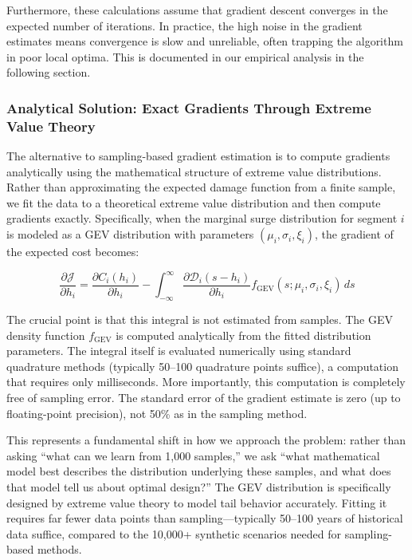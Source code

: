 \documentclass[review]{elsarticle}
\begin{document}
Furthermore, these calculations assume that gradient descent converges in the expected number of iterations. In practice, the high noise in the gradient estimates means convergence is slow and unreliable, often trapping the algorithm in poor local optima. This is documented in our empirical analysis in the following section.

\subsubsection{Analytical Solution: Exact Gradients Through Extreme Value Theory}

The alternative to sampling-based gradient estimation is to compute gradients analytically using the mathematical structure of extreme value distributions. Rather than approximating the expected damage function from a finite sample, we fit the data to a theoretical extreme value distribution and then compute gradients exactly. Specifically, when the marginal surge distribution for segment $i$ is modeled as a GEV distribution with parameters $(\mu_i, \sigma_i, \xi_i)$, the gradient of the expected cost becomes:

\begin{equation}
\frac{\partial \mathcal{J}}{\partial h_i} = \frac{\partial C_i(h_i)}{\partial h_i} - \int_{-\infty}^{\infty} \frac{\partial \mathcal{D}_i(s - h_i)}{\partial h_i} f_{\text{GEV}}(s; \mu_i, \sigma_i, \xi_i) \, ds
\label{eq:analytical_gradient}
\end{equation}

The crucial point is that this integral is not estimated from samples. The GEV density function $f_{\text{GEV}}$ is computed analytically from the fitted distribution parameters. The integral itself is evaluated numerically using standard quadrature methods (typically 50--100 quadrature points suffice), a computation that requires only milliseconds. More importantly, this computation is completely free of sampling error. The standard error of the gradient estimate is zero (up to floating-point precision), not 50\% as in the sampling method.

This represents a fundamental shift in how we approach the problem: rather than asking ``what can we learn from 1,000 samples,'' we ask ``what mathematical model best describes the distribution underlying these samples, and what does that model tell us about optimal design?'' The GEV distribution is specifically designed by extreme value theory to model tail behavior accurately. Fitting it requires far fewer data points than sampling---typically 50--100 years of historical data suffice, compared to the 10,000+ synthetic scenarios needed for sampling-based methods.
\end{document}
